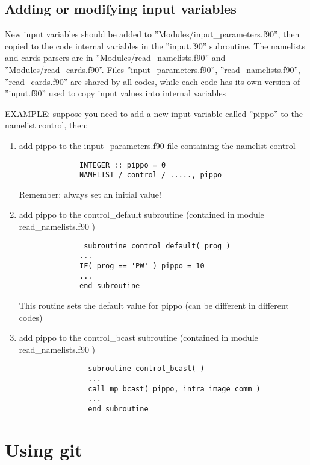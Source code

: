 \documentclass[12pt,a4paper]{article}
\begin{document}
\subsection{Adding or modifying input variables}

New input variables should be added to
''Modules/input\_parameters.f90'',
then copied to the code internal variables in the ''input.f90''
subroutine. The namelists and cards parsers are in
''Modules/read\_namelists.f90'' and ''Modules/read\_cards.f90''.
Files ''input\_parameters.f90'', ''read\_namelists.f90'',
''read\_cards.f90'' are shared by all codes, while each code
has its own version of ''input.f90''  used to copy input values
into internal variables

EXAMPLE:
suppose you need to add a new input variable called ''pippo''
to the namelist control, then:

\begin{enumerate}
\item add pippo to the input\_parameters.f90 file containing the
namelist control
\begin{verbatim}
              INTEGER :: pippo = 0
              NAMELIST / control / ....., pippo
\end{verbatim}
Remember: always set an initial value!

\item add pippo to the control\_default subroutine (contained in
module read\_namelists.f90 )
\begin{verbatim}
               subroutine control_default( prog )
              ...
              IF( prog == 'PW' ) pippo = 10
              ...
              end subroutine
\end{verbatim}
This routine sets the default value for pippo (can be different in
different codes)

\item add pippo to the control\_bcast subroutine (contained in module
read\_namelists.f90 )
 \begin{verbatim}
                subroutine control_bcast( )
                ...
                call mp_bcast( pippo, intra_image_comm )
                ...
                end subroutine
\end{verbatim}
\end{enumerate}


\section{Using git}
\label{Sec:git}
\end{document}
